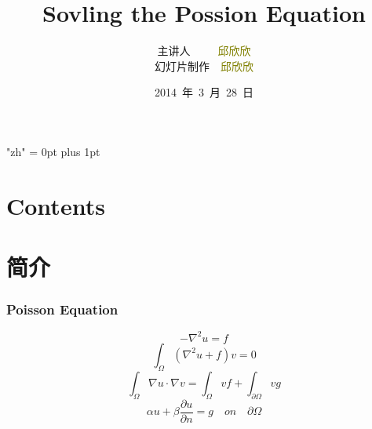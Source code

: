 \documentclass[notheorems,mathserif,table,compress]{beamer}  %
\begin{document}
\XeTeXlinebreaklocale "zh"         %
\XeTeXlinebreakskip = 0pt plus 1pt %


\title{Sovling the Possion Equation}
\author[qiu]{主讲人~~~~~\textcolor{olive}{邱欣欣}\\
    \quad 幻灯片制作~~\textcolor{olive}{邱欣欣}}
\institute[中国海洋大学]{\small\textcolor{violet}{中国海洋大学~~信息科学与工程学院}}
\date{2014~年~3~月~28~日}
\frame{ \titlepage }
\section*{Contents}
\frame{\frametitle{}\tableofcontents}
\section{简介}

\begin{frame}
\frametitle{Poisson Equation}
\begin{displaymath}
-\nabla^2u=f
\end{displaymath}
\begin{displaymath}
\int_{\Omega}(\nabla^2u+f)v=0
\end{displaymath}
\newline
\begin{displaymath}
\int_{\Omega}\nabla u\cdot\nabla v=\int_{\Omega}vf+\int_{\partial\Omega}vg
\end{displaymath}
\begin{displaymath}
\alpha u+\beta \frac{\partial u}{\partial n}=g \quad on \quad\partial \Omega
\end{displaymath}
\end{frame}
\end{document}
